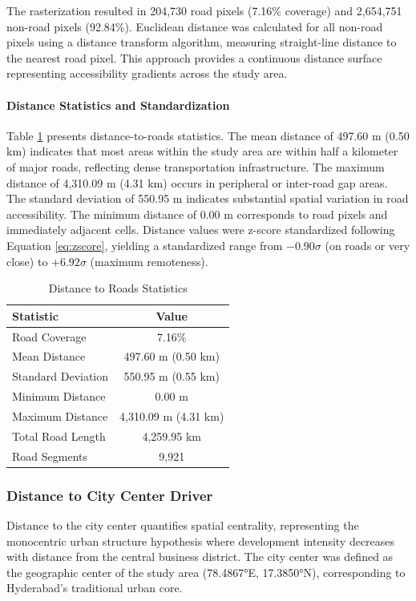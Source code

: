 \documentclass[conference]{IEEEtran}
\begin{document}
The rasterization resulted in 204,730 road pixels (7.16\% coverage) and 2,654,751 non-road pixels (92.84\%). Euclidean distance was calculated for all non-road pixels using a distance transform algorithm, measuring straight-line distance to the nearest road pixel. This approach provides a continuous distance surface representing accessibility gradients across the study area.

\paragraph{Distance Statistics and Standardization}
Table \ref{tab:distance_roads_stats} presents distance-to-roads statistics. The mean distance of 497.60 m (0.50 km) indicates that most areas within the study area are within half a kilometer of major roads, reflecting dense transportation infrastructure. The maximum distance of 4,310.09 m (4.31 km) occurs in peripheral or inter-road gap areas. The standard deviation of 550.95 m indicates substantial spatial variation in road accessibility. The minimum distance of 0.00 m corresponds to road pixels and immediately adjacent cells. Distance values were z-score standardized following Equation \ref{eq:zscore}, yielding a standardized range from $-0.90\sigma$ (on roads or very close) to $+6.92\sigma$ (maximum remoteness).

\begin{table}[!t]
\caption{Distance to Roads Statistics}
\label{tab:distance_roads_stats}
\centering
\small
\begin{tabular}{lc}
\toprule
\textbf{Statistic} & \textbf{Value} \\
\midrule
Road Coverage & 7.16\% \\
Mean Distance & 497.60 m (0.50 km) \\
Standard Deviation & 550.95 m (0.55 km) \\
Minimum Distance & 0.00 m \\
Maximum Distance & 4,310.09 m (4.31 km) \\
Total Road Length & 4,259.95 km \\
Road Segments & 9,921 \\
\bottomrule
\end{tabular}
\end{table}
\subsubsection{Distance to City Center Driver}

Distance to the city center quantifies spatial centrality, representing the monocentric urban structure hypothesis where development intensity decreases with distance from the central business district. The city center was defined as the geographic center of the study area (78.4867°E, 17.3850°N), corresponding to Hyderabad's traditional urban core.
\end{document}
